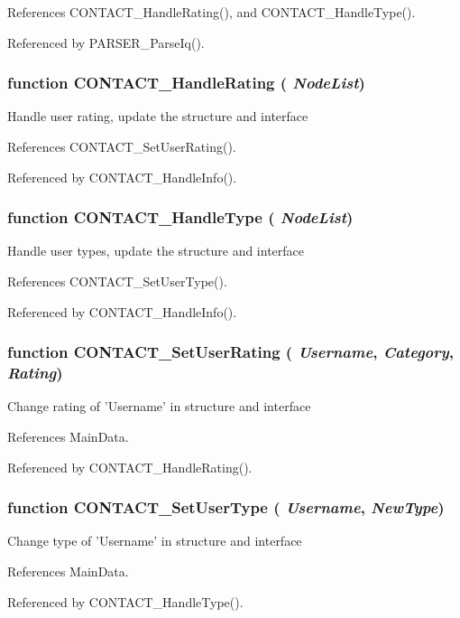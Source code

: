 References CONTACT\_\-HandleRating(), and CONTACT\_\-HandleType().

Referenced by PARSER\_\-ParseIq().
\subsubsection{\setlength{\rightskip}{0pt plus 5cm}function CONTACT\_\-HandleRating ( {\em NodeList})}\label{info_8js_8eed364d5c5d3be5d928ae50c6952823}


Handle user rating, update the structure and interface 

References CONTACT\_\-SetUserRating().

Referenced by CONTACT\_\-HandleInfo().
\subsubsection{\setlength{\rightskip}{0pt plus 5cm}function CONTACT\_\-HandleType ( {\em NodeList})}\label{info_8js_47b4166f6a379fd6415d47a9d777cca5}


Handle user types, update the structure and interface 

References CONTACT\_\-SetUserType().

Referenced by CONTACT\_\-HandleInfo().
\subsubsection{\setlength{\rightskip}{0pt plus 5cm}function CONTACT\_\-SetUserRating ( {\em Username}, \/   {\em Category}, \/   {\em Rating})}\label{info_8js_cfe04b0f835f6bf6c8e46a7bc6f7f688}


Change rating of 'Username' in structure and interface 

References MainData.

Referenced by CONTACT\_\-HandleRating().
\subsubsection{\setlength{\rightskip}{0pt plus 5cm}function CONTACT\_\-SetUserType ( {\em Username}, \/   {\em NewType})}\label{info_8js_4aa77385acda3e8efe17f6f033bd83a3}


Change type of 'Username' in structure and interface 

References MainData.

Referenced by CONTACT\_\-HandleType().